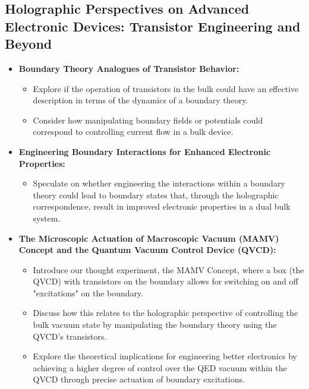 \documentclass{amsart}
\begin{document}
\subsection{Holographic Perspectives on Advanced Electronic Devices: Transistor Engineering and Beyond}
\begin{itemize}
    \item \textbf{Boundary Theory Analogues of Transistor Behavior:}
        \begin{itemize}
            \item Explore if the operation of transistors in the bulk could have an effective description in terms of the dynamics of a boundary theory.
            \item Consider how manipulating boundary fields or potentials could correspond to controlling current flow in a bulk device.
        \end{itemize}
    \item \textbf{Engineering Boundary Interactions for Enhanced Electronic Properties:}
        \begin{itemize}
            \item Speculate on whether engineering the interactions within a boundary theory could lead to boundary states that, through the holographic correspondence, result in improved electronic properties in a dual bulk system.
        \end{itemize}
    \item \textbf{The Microscopic Actuation of Macroscopic Vacuum (MAMV) Concept and the Quantum Vacuum Control Device (QVCD):}
        \begin{itemize}
            \item Introduce our thought experiment, the MAMV Concept, where a box (the QVCD) with transistors on the boundary allows for switching on and off "excitations" on the boundary.
            \item Discuss how this relates to the holographic perspective of controlling the bulk vacuum state by manipulating the boundary theory using the QVCD's transistors.
            \item Explore the theoretical implications for engineering better electronics by achieving a higher degree of control over the QED vacuum within the QVCD through precise actuation of boundary excitations.
        \end{itemize}
\end{itemize}
\end{document}
